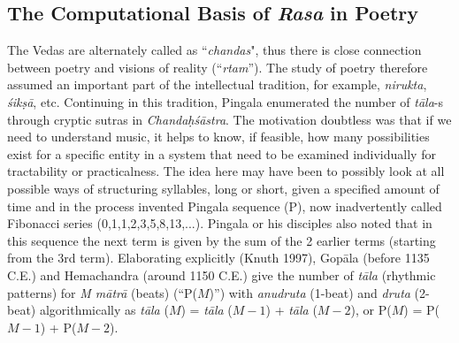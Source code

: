 \subsection{The Computational Basis of \textsl{Rasa} in Poetry}\label{chap7-sec5.1}

The Vedas are alternately called as “\textsl{chandas}", thus there is close connection between poetry and visions of reality (“\textsl{rtam}”). The study of poetry therefore assumed an important part of the intellectual tradition, for example, \textsl{nirukta}, \textsl{śikṣā}, etc. Continuing in this tradition, Pingala enumerated the number of \textsl{tāla}-s through cryptic sutras in \textsl{Chandaḥśāstra}. The motivation doubtless was that if we need to understand music, it helps to know, if feasible, how many possibilities exist for a specific entity in a system that need to be examined individually for tractability or practicalness. The idea here may have been to possibly look at all possible ways of structuring syllables, long or short, given a specified amount of time and in the process invented Pingala sequence (P), now inadvertently called Fibonacci series (0,1,1,2,3,5,8,13,...). Pingala or his disciples also noted that in this sequence the next term is given by the sum of the 2 earlier terms (starting from the 3rd term). Elaborating explicitly (Knuth 1997), Gopāla (before 1135 C.E.) and Hemachandra (around 1150 C.E.) give the number of \textsl{tāla} (rhythmic patterns) for \textsl{M mātrā} (beats) (“P($M$)”) with \textsl{anudruta} (1-beat) and \textsl{druta} (2-beat) algorithmically as \textsl{tāla} ($M$) = \textsl{tāla} ($M-1$) + \textsl{tāla} ($M-2$), or P($M$) = P($M-1$) + P($M-2$).

